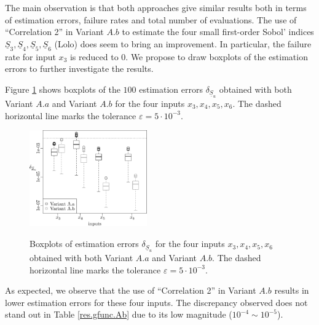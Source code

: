 The main observation is that both approaches give similar results both in terms of estimation errors, failure rates and total number of evaluations. The use of ``Correlation 2'' in Variant $A.b$ to estimate the four small first-order Sobol' indices $\underline{S}_3, \underline{S}_4, \underline{S}_5, \underline{S}_6$ {\color{purple} (Lolo) does seem to bring an improvement. In particular, the failure rate for input $x_3$ is reduced to $0$.} We propose to draw boxplots of the estimation errors to further investigate the results. 

Figure \ref{boxplots.gfunc} shows boxplots of the $100$ estimation errors $\delta_{\underline{S}_u}$ obtained with both Variant $A.a$ and Variant $A.b$ for the four inputs $x_3,x_4,x_5,x_6$. The dashed horizontal line marks the tolerance $\varepsilon=5\cdot 10^{-3}$.
\begin{figure}[t]
\caption{Boxplots of estimation errors $\delta_{\underline{S}_u}$ for the four inputs $x_3,x_4,x_5,x_6$ obtained with both Variant $A.a$ and Variant $A.b$. The dashed horizontal line marks the tolerance $\varepsilon=5\cdot 10^{-3}$.}
\vspace*{0.2cm}
\centering
\includegraphics[width=0.45\textwidth]{sobolg_box.eps}
\label{boxplots.gfunc}
\end{figure}

As expected, we observe that the use of ``Correlation 2'' in Variant $A.b$ results in lower estimation errors for these four inputs. The discrepancy observed does not stand out in Table \ref{res.gfunc.Ab} due to its low magnitude ($10^{-4} \sim 10^{-5}$).

